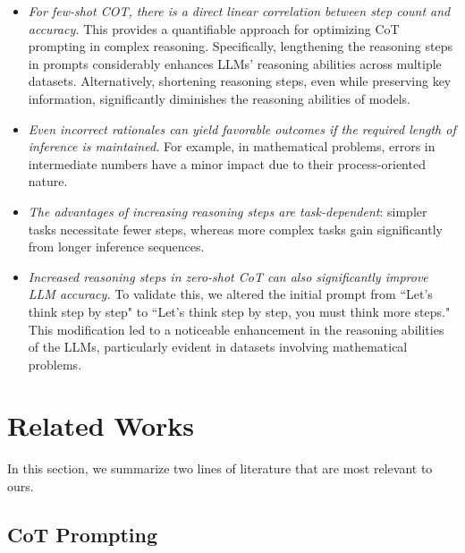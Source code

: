 \documentclass[11pt]{article}
\begin{document}
\begin{itemize}[leftmargin=*]\setlength\itemsep{-0.3em}

\item \emph{For few-shot COT, there is a direct linear correlation between step count and accuracy.} This provides a quantifiable approach for optimizing CoT prompting in complex reasoning. Specifically, lengthening the reasoning steps in prompts considerably enhances LLMs' reasoning abilities across multiple datasets. Alternatively, shortening reasoning steps, even while preserving key information, significantly diminishes the reasoning abilities of models.
%
\item \emph{Even incorrect rationales can yield favorable outcomes if the required length of inference is maintained.} For example, in mathematical problems, errors in intermediate numbers have a minor impact due to their process-oriented nature.

\item \emph{The advantages of increasing reasoning steps are task-dependent}: simpler tasks necessitate fewer steps, whereas more complex tasks gain significantly from longer inference sequences.

\item \emph{Increased reasoning steps in zero-shot CoT can also significantly improve LLM accuracy.} To validate this, we altered the initial prompt from ``Let's think step by step" to ``Let's think step by step, you must think more steps." This modification led to a noticeable enhancement in the reasoning abilities of the LLMs, particularly evident in datasets involving mathematical problems.

\end{itemize}

\phantom{Invisible Text}
\vspace{-\baselineskip}

\section{Related Works}

In this section, we summarize two lines of literature that are most relevant to ours.


\phantom{Invisible Text}
\vspace{-\baselineskip}

\subsection{CoT Prompting}
\end{document}
